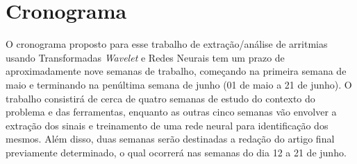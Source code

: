 \documentclass[conference]{IEEEtran}
\begin{document}


%
%




\section{Cronograma}

O cronograma proposto para esse trabalho de extração/análise de arritmias usando Transformadas \textit{Wavelet} e Redes Neurais tem um prazo de aproximadamente nove semanas de trabalho, começando na primeira semana de maio e terminando na penúltima semana de junho (01 de maio a 21 de junho). O trabalho consistirá de cerca de quatro semanas de estudo do contexto do problema e das ferramentas, enquanto as outras cinco semanas vão envolver a extração dos sinais e treinamento de uma rede neural para identificação dos mesmos. Além disso, duas semanas serão destinadas a redação do artigo final previamente determinado, o qual ocorrerá nas semanas do dia 12 a 21 de junho.
\end{document}
